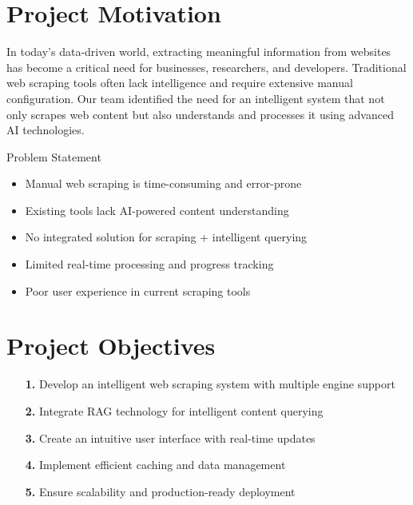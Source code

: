 \documentclass[12pt,a4paper]{report}
\begin{document}
\section{Project Motivation}

In today's data-driven world, extracting meaningful information from websites has become a critical need for businesses, researchers, and developers. Traditional web scraping tools often lack intelligence and require extensive manual configuration. Our team identified the need for an intelligent system that not only scrapes web content but also understands and processes it using advanced AI technologies.

\begin{featurebox}{Problem Statement}
\begin{itemize}
    \item Manual web scraping is time-consuming and error-prone
    \item Existing tools lack AI-powered content understanding
    \item No integrated solution for scraping + intelligent querying
    \item Limited real-time processing and progress tracking
    \item Poor user experience in current scraping tools
\end{itemize}
\end{featurebox}

\section{Project Objectives}

\begin{enumerate}[leftmargin=2cm]
    \item[\textcolor{accentorange}{\textbf{1.}}] Develop an intelligent web scraping system with multiple engine support
    \item[\textcolor{accentorange}{\textbf{2.}}] Integrate RAG technology for intelligent content querying
    \item[\textcolor{accentorange}{\textbf{3.}}] Create an intuitive user interface with real-time updates
    \item[\textcolor{accentorange}{\textbf{4.}}] Implement efficient caching and data management
    \item[\textcolor{accentorange}{\textbf{5.}}] Ensure scalability and production-ready deployment
\end{enumerate}
\end{document}
